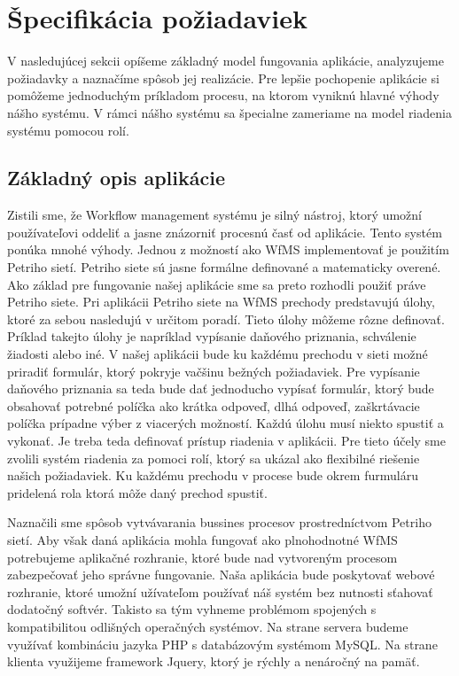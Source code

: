 


\section{Špecifikácia požiadaviek}
V nasledujúcej sekcii opíšeme základný model fungovania aplikácie, analyzujeme  požiadavky a naznačíme spôsob jej realizácie. Pre lepšie pochopenie aplikácie si pomôžeme jednoduchým príkladom procesu, na ktorom vyniknú hlavné výhody nášho systému. V rámci nášho systému sa špecialne zameriame na model riadenia systému pomocou rolí.  

\subsection{Základný opis aplikácie}
Zistili sme, že Workflow management systému je silný nástroj, ktorý umožní používateľovi oddeliť a jasne znázorniť procesnú časť od aplikácie. Tento systém ponúka mnohé výhody. Jednou z možností ako WfMS implementovať je použitím Petriho sietí. Petriho siete sú jasne formálne definované a matematicky overené. Ako základ pre fungovanie našej aplikácie sme sa preto rozhodli použiť práve Petriho siete. Pri aplikácii Petriho siete na WfMS prechody predstavujú úlohy, ktoré za sebou nasledujú v určitom poradí. Tieto úlohy môžeme rôzne definovať.  Príklad takejto úlohy je napríklad vypísanie daňového priznania, schválenie žiadosti alebo iné. V našej aplikácii bude ku každému prechodu v sieti možné priradiť formulár, ktorý pokryje vačšinu bežných požiadaviek. Pre vypísanie daňového priznania sa teda bude dať jednoducho vypísať formulár, ktorý bude obsahovať potrebné políčka ako krátka odpoveď, dlhá odpoveď, zaškrtávacie políčka prípadne výber z viacerých možností. Každú úlohu musí niekto spustiť a vykonať. Je treba teda definovať prístup riadenia v aplikácii. Pre tieto účely sme zvolili systém riadenia za pomoci rolí, ktorý sa ukázal ako flexibilné riešenie našich požiadaviek. Ku každému prechodu v procese bude okrem furmuláru pridelená rola ktorá môže daný prechod spustiť. 

Naznačili sme spôsob vytvávarania bussines procesov prostredníctvom Petriho sietí. Aby však daná aplikácia mohla fungovať ako plnohodnotné WfMS potrebujeme aplikačné rozhranie, ktoré bude nad vytvoreným procesom zabezpečovať jeho správne fungovanie. Naša aplikácia bude poskytovať webové rozhranie, ktoré umožní užívateľom používať náš systém bez nutnosti sťahovať dodatočný softvér. Takisto sa tým vyhneme problémom spojených s kompatibilitou odlišných operačných systémov.  Na strane servera budeme využívať kombináciu jazyka PHP s databázovým systémom MySQL. Na strane klienta využijeme framework  Jquery, ktorý je rýchly a nenáročný na pamäť.

